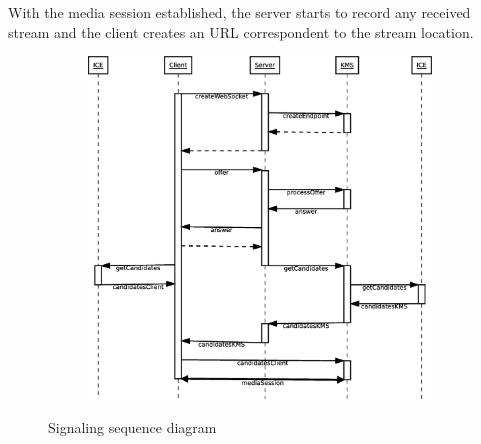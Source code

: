 With the media session established, the server starts to record any received stream and the client creates an \ac{URL} correspondent to the stream location.

\begin{figure}[H]
    \centering
    \begin{subfigure}[b]{\linewidth}
    	\includegraphics[width=\textwidth]{figures/signaling}
    \end{subfigure}
    \caption{Signaling sequence diagram}
\end{figure} 

